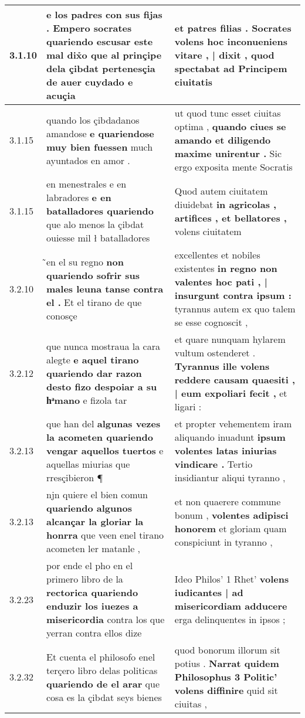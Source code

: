 \begin{tabular}{|p{1cm}|p{6.5cm}|p{6.5cm}|}
3.1.10 & e los padres con sus fijas . \textbf{ Empero socrates quariendo escusar este mal dix̉o } que al prinçipe dela çibdat pertenesçia de auer cuydado e acuçia & et patres filias . \textbf{ Socrates volens hoc inconueniens vitare , | dixit , } quod spectabat ad Principem ciuitatis \\\hline
3.1.15 & quando los çibdadanos amandose \textbf{ e quariendose muy bien fuessen } much ayuntados en amor . & ut quod tunc esset ciuitas optima , \textbf{ quando ciues se amando et diligendo maxime unirentur . } Sic ergo exposita mente Socratis \\\hline
3.1.15 & en menestrales e en labradores \textbf{ e en batalladores quariendo } que alo menos la çibdat ouiesse mil ł batalladores & Quod autem ciuitatem diuidebat \textbf{ in agricolas , artifices , et bellatores , } volens ciuitatem \\\hline
3.2.10 & ̃en el su regno \textbf{ non quariendo sofrir sus males leuna tanse contra el . } Et el tirano de que conosçe & excellentes et nobiles existentes \textbf{ in regno non valentes hoc pati , | insurgunt contra ipsum : } tyrannus autem ex quo talem se esse cognoscit , \\\hline
3.2.12 & que nunca mostraua la cara alegte \textbf{ e aquel tirano quariendo dar razon desto fizo despoiar a su hͣmano } e fizola tar & et quare nunquam hylarem vultum ostenderet . \textbf{ Tyrannus ille volens reddere causam quaesiti , | eum expoliari fecit , } et ligari : \\\hline
3.2.13 & que han del \textbf{ algunas vezes la acometen quariendo vengar aquellos tuertos } e aquellas miurias que rresçibieron ¶ & et propter vehementem iram aliquando inuadunt \textbf{ ipsum volentes latas iniurias vindicare . } Tertio insidiantur aliqui tyranno , \\\hline
3.2.13 & njn quiere el bien comun \textbf{ quariendo algunos alcançar la gloriar la honrra } que veen enel tirano acometen ler matanle , & et non quaerere commune bonum , \textbf{ volentes adipisci honorem } et gloriam quam conspiciunt in tyranno , \\\hline
3.2.23 & por ende el pho en el primero libro de la \textbf{ rectorica quariendo enduzir los iuezes a misericordia } contra los que yerran contra ellos dize & Ideo Philos’ 1 Rhet’ \textbf{ volens iudicantes | ad misericordiam adducere } erga delinquentes in ipsos ; \\\hline
3.2.32 & Et cuenta el philosofo enel terçero libro delas politicas \textbf{ quariendo de el arar } que cosa es la çibdat seys bienes & quod bonorum illorum sit potius . \textbf{ Narrat quidem Philosophus 3 Politic’ volens diffinire } quid sit ciuitas , \\\hline

\end{tabular}
